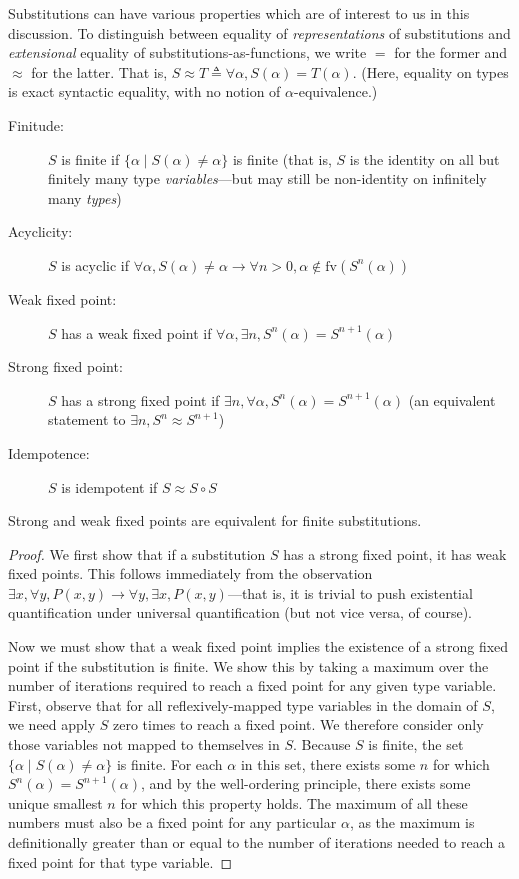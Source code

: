 \documentclass[10pt, letterpaper, oneside]{article}
\newcommand{\fv}{\mathrm{fv}}
\begin{document}
Substitutions can have various properties which are of interest to us in this discussion. To distinguish between equality of \emph{representations} of substitutions and \emph{extensional} equality of substitutions-as-functions, we write \(=\) for the former and \(\approx\) for the latter. That is, \(S \approx T \triangleq \forall \alpha, S(\alpha) = T(\alpha)\). (Here, equality on types is exact syntactic equality, with no notion of \(\alpha\)-equivalence.)

\begin{description}
\item[Finitude:] \(S\) is finite if \(\{\alpha \mid S(\alpha) \ne \alpha\}\) is finite (that is, \(S\) is the identity on all but finitely many type \emph{variables}---but may still be non-identity on infinitely many \emph{types})
\item[Acyclicity:] \(S\) is acyclic if \(\forall \alpha, S(\alpha) \ne \alpha \to \forall n > 0, \alpha \notin \fv(S^n(\alpha))\)
\item[Weak fixed point:] \(S\) has a weak fixed point if \(\forall \alpha, \exists n, S^n(\alpha) = S^{n + 1}(\alpha)\)
\item[Strong fixed point:] \(S\) has a strong fixed point if \(\exists n, \forall \alpha, S^n(\alpha) = S^{n + 1}(\alpha)\) (an equivalent statement to \(\exists n, S^n \approx S^{n + 1}\))
\item[Idempotence:] \(S\) is idempotent if \(S \approx S \circ S\)
\end{description}

\begin{lemma}
  \label{lemma:strong-weak}
  Strong and weak fixed points are equivalent for finite substitutions.
\end{lemma}

\begin{proof}
  We first show that if a substitution \(S\) has a strong fixed point, it has weak fixed points. This follows immediately from the observation \(\exists x, \forall y, P(x,y) \to \forall y, \exists x, P(x,y)\)---that is, it is trivial to push existential quantification under universal quantification (but not vice versa, of course).

  Now we must show that a weak fixed point implies the existence of a strong fixed point if the substitution is finite. We show this by taking a maximum over the number of iterations required to reach a fixed point for any given type variable. First, observe that for all reflexively-mapped type variables in the domain of \(S\), we need apply \(S\) zero times to reach a fixed point. We therefore consider only those variables not mapped to themselves in \(S\). Because \(S\) is finite, the set \(\{\alpha \mid S(\alpha) \ne \alpha\}\) is finite. For each \(\alpha\) in this set, there exists some \(n\) for which \(S^n(\alpha) = S^{n + 1}(\alpha)\), and by the well-ordering principle, there exists some unique smallest \(n\) for which this property holds. The maximum of all these numbers must also be a fixed point for any particular \(\alpha\), as the maximum is definitionally greater than or equal to the number of iterations needed to reach a fixed point for that type variable.
\end{proof}
\end{document}
